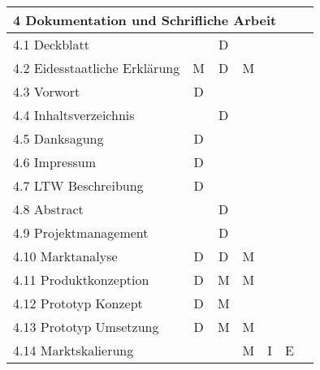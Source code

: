 \begin{longtable}{|l|c|c|c|c|c|c|}
    \multicolumn{7}{|l|}{4 Dokumentation und Schrifliche Arbeit}                                                                  \\ \hline
    4.1 Deckblatt                          &                & D           &            &          &               &               \\ \hline
    4.2 Eidesstaatliche Erklärung          & M              & D           & M          &          &               &               \\ \hline
    4.3 Vorwort                            & D              &             &            &          &               &               \\ \hline
    4.4 Inhaltsverzeichnis                 &                & D           &            &          &               &               \\ \hline
    4.5 Danksagung                         & D              &             &            &          &               &               \\ \hline
    4.6 Impressum                          & D              &             &            &          &               &               \\ \hline
    4.7 LTW Beschreibung                   & D              &             &            &          &               &               \\ \hline
    4.8 Abstract                           &                & D           &            &          &               &               \\ \hline
    4.9 Projektmanagement                  &                & D           &            &          &               &               \\ \hline
    4.10 Marktanalyse                      & D              & D           & M          &          &               &               \\ \hline
    4.11 Produktkonzeption                 & D              & M           & M          &          &               &               \\ \hline
    4.12 Prototyp Konzept                  & D              & M           &            &          &               &               \\ \hline
    4.13 Prototyp Umsetzung                & D              & M           & M          &          &               &               \\ \hline
    4.14 Marktskalierung                   &                &             & M          & I        & E             &               \\ \hline

\end{longtable}
